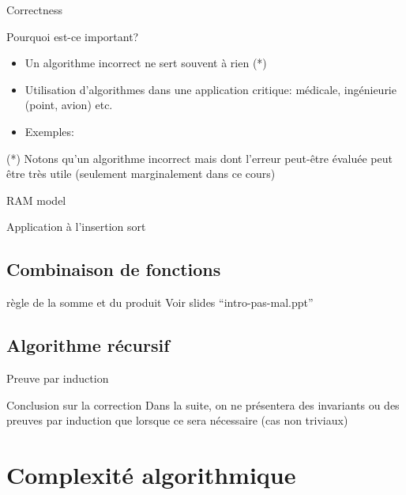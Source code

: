 \begin{frame}{Correctness}

Pourquoi est-ce important?
\begin{itemize}
\item Un algorithme incorrect ne sert souvent à rien (*)
\item Utilisation d'algorithmes dans une application critique:
  médicale, ingénieurie (point, avion) etc.
\item Exemples:
\end{itemize}

(*) Notons qu'un algorithme incorrect mais dont l'erreur peut-être
évaluée peut être très utile (seulement marginalement dans ce cours)
\end{frame}

\begin{frame}{RAM model}

\end{frame}

\begin{frame}{Application à l'insertion sort}
\end{frame}

\subsection{Combinaison de fonctions}

\begin{frame}{règle de la somme et du produit}
Voir slides ``intro-pas-mal.ppt''
\end{frame}

\subsection{Algorithme récursif}

\begin{frame}{Preuve par induction}

\end{frame}

\begin{frame}{Conclusion sur la correction}
Dans la suite, on ne présentera des invariants ou des preuves par induction que lorsque ce sera nécessaire (cas non triviaux)
\end{frame}

\section{Complexité algorithmique}

